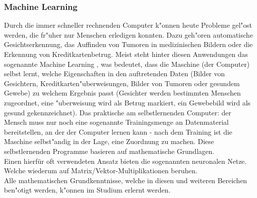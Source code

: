 \subsubsection{Machine Learning}
Durch die immer schneller rechnenden Computer k"onnen heute Probleme gel"ost werden, die fr"uher nur Menschen erledigen konnten. Dazu geh"oren automatische Gesichtserkennung, das Auffinden von Tumoren in medizinischen Bildern oder die Erkennung von Kreditkartenbetrug. Meist steht hinter diesen Anwendungen das sogenannte \glqq Machine Learning \grqq, was bedeutet, dass die Maschine (der Computer) selbst lernt, welche Eigenschaften in den auftretenden Daten (Bilder von Gesichtern, Kreditkarten"uberweisungen, Bilder von Tumoren oder gesundem Gewebe) zu welchem Ergebnis passt (Gesichter werden bestimmten Menschen zugeordnet, eine "uberweisung wird als Betrug markiert, ein Gewebebild wird als gesund gekennzeichnet). Das praktische am selbstlernenden Computer: der Mensch muss nur noch eine sogenannte Trainingsmenge an Datenmaterial bereitstellen, an der der Computer lernen kann - nach dem Training ist die Maschine selbst"andig in der Lage, eine Zuordnung zu machen.
Diese selbstlernenden Programme basieren auf mathematische Grundlagen.\\
Einen hierfür oft verwendeten Ansatz bieten die sogenannten \glqq neuronalen Netze\grqq.
Welche wiederum auf  Ma\-trix/\-Vektor-\-Multiplikationen beruhen.\vspace{0.5cm}\\
Alle mathematischen Grundkenntnisse, welche in diesen und weiteren Bereichen ben"otigt werden, k"onnen im Studium erlernt werden.